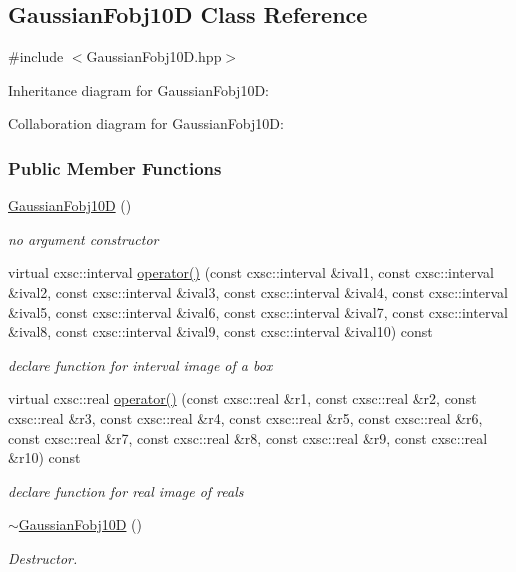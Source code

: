 \hypertarget{classGaussianFobj10D}{\subsection{\-Gaussian\-Fobj10\-D \-Class \-Reference}
\label{classGaussianFobj10D}
}


{\ttfamily \#include $<$\-Gaussian\-Fobj10\-D.\-hpp$>$}



\-Inheritance diagram for \-Gaussian\-Fobj10\-D\-:


\-Collaboration diagram for \-Gaussian\-Fobj10\-D\-:
\subsubsection*{\-Public \-Member \-Functions}
\begin{DoxyCompactItemize}
\item 
\hyperlink{classGaussianFobj10D_a8d94f22c41a2753ccb14decacb713248}{\-Gaussian\-Fobj10\-D} ()
\begin{DoxyCompactList}\small\item\em no argument constructor \end{DoxyCompactList}\item 
virtual cxsc\-::interval \hyperlink{classGaussianFobj10D_a8c3256f717a1738bc0e28447d2122ec2}{operator()} (const cxsc\-::interval \&ival1, const cxsc\-::interval \&ival2, const cxsc\-::interval \&ival3, const cxsc\-::interval \&ival4, const cxsc\-::interval \&ival5, const cxsc\-::interval \&ival6, const cxsc\-::interval \&ival7, const cxsc\-::interval \&ival8, const cxsc\-::interval \&ival9, const cxsc\-::interval \&ival10) const 
\begin{DoxyCompactList}\small\item\em declare function for interval image of a box \end{DoxyCompactList}\item 
virtual cxsc\-::real \hyperlink{classGaussianFobj10D_ad19fde0d1a001dfb13930aabc342e6ac}{operator()} (const cxsc\-::real \&r1, const cxsc\-::real \&r2, const cxsc\-::real \&r3, const cxsc\-::real \&r4, const cxsc\-::real \&r5, const cxsc\-::real \&r6, const cxsc\-::real \&r7, const cxsc\-::real \&r8, const cxsc\-::real \&r9, const cxsc\-::real \&r10) const 
\begin{DoxyCompactList}\small\item\em declare function for real image of reals \end{DoxyCompactList}\item 
\hyperlink{classGaussianFobj10D_a48e1bd6390dc0672b0b35cad24a14262}{$\sim$\-Gaussian\-Fobj10\-D} ()
\begin{DoxyCompactList}\small\item\em \-Destructor. \end{DoxyCompactList}\end{DoxyCompactItemize}


